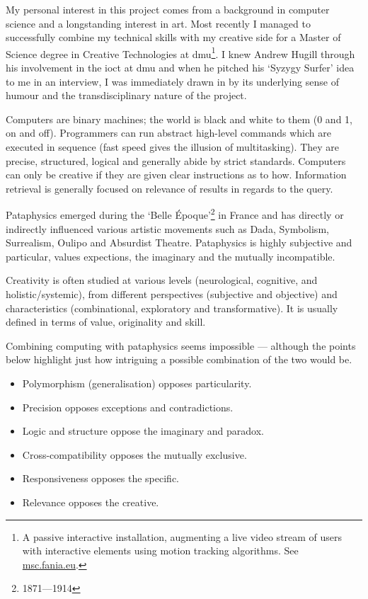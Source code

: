 My personal interest in this project comes from a background in computer science and a longstanding interest in art. Most recently I managed to successfully combine my technical skills with my creative side for a Master of Science degree in Creative Technologies at \gls{dmu}\footnote{A passive interactive installation, augmenting a live video stream of users with interactive elements using motion tracking algorithms. See \url{msc.fania.eu}.}. I knew Andrew Hugill through his involvement in the \gls{ioct} at \gls{dmu} and when he pitched his `Syzygy Surfer' \autocite{Hendler2011, Hendler2013} idea to me in an interview, I was immediately drawn in by its underlying sense of humour and the transdisciplinary nature of the project.

\spirals

Computers are binary machines; the world is black and white to them (0 and 1, on and off). Programmers can run abstract high-level commands which are executed in sequence (fast speed gives the illusion of multitasking). They are precise, structured, logical and generally abide by strict standards. Computers can only be creative if they are given clear instructions as to how. Information retrieval is generally focused on relevance of results in regards to the query.

Pataphysics emerged during the `Belle Époque'\footnote{1871---1914} in France and has directly or indirectly influenced various artistic movements such as Dada, Symbolism, Surrealism, Oulipo and Absurdist Theatre. Pataphysics is highly subjective and particular, values expections, the imaginary and the mutually incompatible.

Creativity is often studied at various levels (neurological, cognitive, and holistic/systemic), from different perspectives (subjective and objective) and characteristics (combinational, exploratory and transformative). It is usually defined in terms of value, originality and skill.

Combining computing with pataphysics seems impossible --- although the points below highlight just how intriguing a possible combination of the two would be.

\begin{itemize}
  \item Polymorphism (generalisation) opposes particularity.
  \item Precision opposes exceptions and contradictions.
  \item Logic and structure oppose the imaginary and paradox.
  \item Cross-compatibility opposes the mutually exclusive.
  \item Responsiveness opposes the specific.
  \item Relevance opposes the creative.
\end{itemize}

